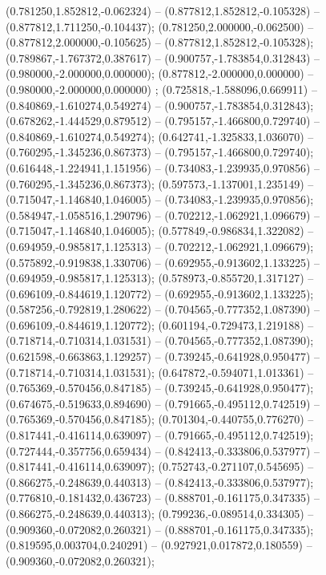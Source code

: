  (0.781250,1.852812,-0.062324) -- (0.877812,1.852812,-0.105328) -- (0.877812,1.711250,-0.104437);
 (0.781250,2.000000,-0.062500) -- (0.877812,2.000000,-0.105625) -- (0.877812,1.852812,-0.105328);
 (0.789867,-1.767372,0.387617) -- (0.900757,-1.783854,0.312843) -- (0.980000,-2.000000,0.000000);
 (0.877812,-2.000000,0.000000) -- (0.980000,-2.000000,0.000000) ;
 (0.725818,-1.588096,0.669911) -- (0.840869,-1.610274,0.549274) -- (0.900757,-1.783854,0.312843);
 (0.678262,-1.444529,0.879512) -- (0.795157,-1.466800,0.729740) -- (0.840869,-1.610274,0.549274);
 (0.642741,-1.325833,1.036070) -- (0.760295,-1.345236,0.867373) -- (0.795157,-1.466800,0.729740);
 (0.616448,-1.224941,1.151956) -- (0.734083,-1.239935,0.970856) -- (0.760295,-1.345236,0.867373);
 (0.597573,-1.137001,1.235149) -- (0.715047,-1.146840,1.046005) -- (0.734083,-1.239935,0.970856);
 (0.584947,-1.058516,1.290796) -- (0.702212,-1.062921,1.096679) -- (0.715047,-1.146840,1.046005);
 (0.577849,-0.986834,1.322082) -- (0.694959,-0.985817,1.125313) -- (0.702212,-1.062921,1.096679);
 (0.575892,-0.919838,1.330706) -- (0.692955,-0.913602,1.133225) -- (0.694959,-0.985817,1.125313);
 (0.578973,-0.855720,1.317127) -- (0.696109,-0.844619,1.120772) -- (0.692955,-0.913602,1.133225);
 (0.587256,-0.792819,1.280622) -- (0.704565,-0.777352,1.087390) -- (0.696109,-0.844619,1.120772);
 (0.601194,-0.729473,1.219188) -- (0.718714,-0.710314,1.031531) -- (0.704565,-0.777352,1.087390);
 (0.621598,-0.663863,1.129257) -- (0.739245,-0.641928,0.950477) -- (0.718714,-0.710314,1.031531);
 (0.647872,-0.594071,1.013361) -- (0.765369,-0.570456,0.847185) -- (0.739245,-0.641928,0.950477);
 (0.674675,-0.519633,0.894690) -- (0.791665,-0.495112,0.742519) -- (0.765369,-0.570456,0.847185);
 (0.701304,-0.440755,0.776270) -- (0.817441,-0.416114,0.639097) -- (0.791665,-0.495112,0.742519);
 (0.727444,-0.357756,0.659434) -- (0.842413,-0.333806,0.537977) -- (0.817441,-0.416114,0.639097);
 (0.752743,-0.271107,0.545695) -- (0.866275,-0.248639,0.440313) -- (0.842413,-0.333806,0.537977);
 (0.776810,-0.181432,0.436723) -- (0.888701,-0.161175,0.347335) -- (0.866275,-0.248639,0.440313);
 (0.799236,-0.089514,0.334305) -- (0.909360,-0.072082,0.260321) -- (0.888701,-0.161175,0.347335);
 (0.819595,0.003704,0.240291) -- (0.927921,0.017872,0.180559) -- (0.909360,-0.072082,0.260321);

